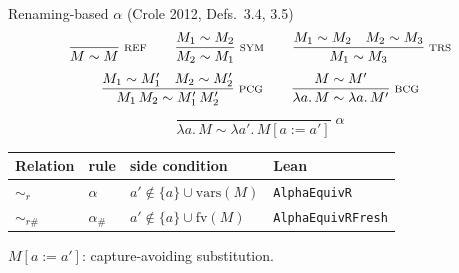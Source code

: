 \documentclass{beamer}
\newcommand{\vars}{\mathrm{vars}}
\newcommand{\fv}{\mathrm{fv}}
\newcommand{\simr}{\sim_{r}}
\newcommand{\simrf}{\sim_{r\#}}
\newcommand{\rn}[1]{\text{\scriptsize\MakeUppercase{#1}}}
\newcommand{\infrule}[3]{\dfrac{#2}{#3}\;\rn{#1}}
\begin{document}
\begin{frame}{Renaming-based $\alpha$ (Crole 2012, Defs.~3.4, 3.5)}
  \[
    \infrule{ref}{}{M \sim M}
    \qquad
    \infrule{sym}{M_1 \sim M_2}{M_2 \sim M_1}
    \qquad
    \infrule{trs}{M_1 \sim M_2 \quad M_2 \sim M_3}{M_1 \sim M_3}
  \]
  \[
    \infrule{pcg}{M_1 \sim M_1' \quad M_2 \sim M_2'}{M_1\, M_2 \sim M_1'\, M_2'}
    \qquad
    \infrule{bcg}{M \sim M'}{\lambda a.\, M \sim \lambda a.\, M'}
  \]
  \[
    \dfrac{}{\lambda a.\, M \sim \lambda a'.\, M[a := a']}\;\alpha
  \]
  \bigskip
  \centering
  \small
  \begin{tabular}{@{}llll@{}}
    \toprule
    Relation & rule & side condition & Lean \\
    \midrule
    $\simr$ & $\alpha$ & $a' \notin \{a\} \cup \vars(M)$ & \texttt{AlphaEquivR} \\
    $\simrf$ & $\alpha_\#$ & $a' \notin \{a\} \cup \fv(M)$ & \texttt{AlphaEquivRFresh} \\
    \bottomrule
  \end{tabular}

  \bigskip
  {\footnotesize $M[a := a']$: capture-avoiding substitution.\par}
\end{frame}
\end{document}

